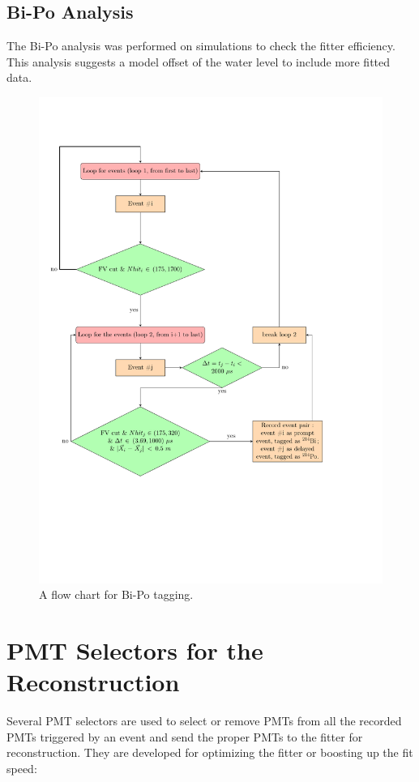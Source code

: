 \subsection{Bi-Po Analysis}
The Bi-Po analysis was performed on simulations to check the fitter efficiency. This analysis suggests a model offset of the water level to include more fitted data.
\begin{figure}[!htb]
	\centering
	\includegraphics[width=15cm]{flowchart_latex.pdf}
	\caption{A flow chart for Bi-Po tagging.}
	\label{biPo_flowchart}
\end{figure}


\section{PMT Selectors for the Reconstruction}\label{sect:PMTselector}
Several PMT selectors are used to select or remove PMTs from all the recorded PMTs triggered by an event and send the proper PMTs to the fitter for reconstruction. They are developed for optimizing the fitter or boosting up the fit speed:

